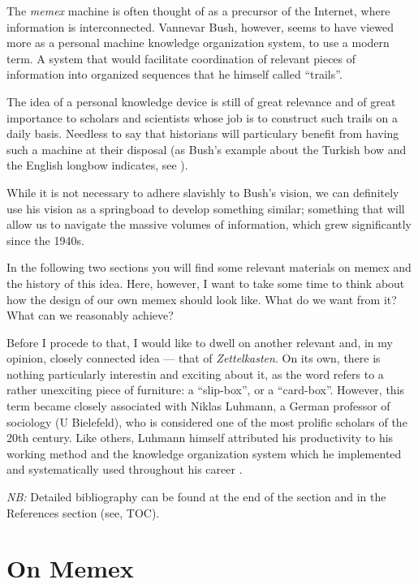 \documentclass[
]{book}
\begin{document}
The \emph{memex} machine is often thought of as a precursor of the Internet, where information is interconnected. Vannevar Bush, however, seems to have viewed more as a personal machine knowledge organization system, to use a modern term. A system that would facilitate coordination of relevant pieces of information into organized sequences that he himself called ``trails''.

The idea of a personal knowledge device is still of great relevance and of great importance to scholars and scientists whose job is to construct such trails on a daily basis. Needless to say that historians will particulary benefit from having such a machine at their disposal (as Bush's example about the Turkish bow and the English longbow indicates, see \citep{BushWe1945}).

While it is not necessary to adhere slavishly to Bush's vision, we can definitely use his vision as a springboad to develop something similar; something that will allow us to navigate the massive volumes of information, which grew significantly since the 1940s.

In the following two sections you will find some relevant materials on memex and the history of this idea. Here, however, I want to take some time to think about how the design of our own memex should look like. What do we want from it? What can we reasonably achieve?

Before I procede to that, I would like to dwell on another relevant and, in my opinion, closely connected idea --- that of \emph{Zettelkasten}. On its own, there is nothing particularly interestin and exciting about it, as the word refers to a rather unexciting piece of furniture: a ``slip-box'', or a ``card-box''. However, this term became closely associated with Niklas Luhmann, a German professor of sociology (U Bielefeld), who is considered one of the most prolific scholars of the 20th century. Like others, Luhmann himself attributed his productivity to his working method and the knowledge organization system which he implemented and systematically used throughout his career \citep[See,][]{LuhmannKommunikation1982, LuhmannArchimedes1987}.

\emph{NB:} Detailed bibliography can be found at the end of the section and in the References section (see, TOC).

\hypertarget{on-memex}{%
\section*{On Memex}\label{on-memex}}
\end{document}
